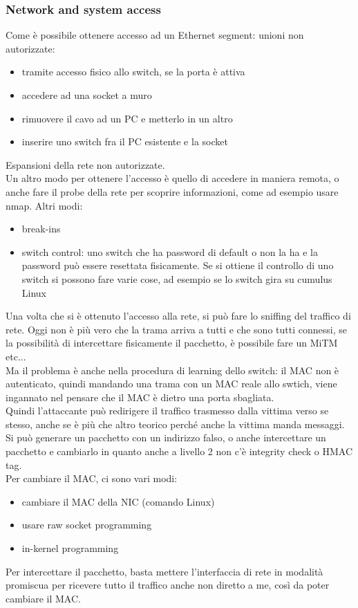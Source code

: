 \documentclass[12pt, oneside]{extbook} %
\begin{document}
\subsubsection{Network and system access}
Come è possibile ottenere accesso ad un Ethernet segment: unioni non autorizzate:
\begin{itemize}
\item tramite accesso fisico allo switch, se la porta è attiva
\item accedere ad una socket a muro
\item rimuovere il cavo ad un PC e metterlo in un altro
\item inserire uno switch fra il PC esistente e la socket
\end{itemize}
Espansioni della rete non autorizzate.\\ Un altro modo per ottenere l'accesso è quello di accedere in maniera remota, o anche fare il probe della rete per scoprire informazioni, come ad esempio usare nmap. Altri modi:
\begin{itemize}
\item break-ins
\item switch control: uno switch che ha password di default o non la ha e la password può essere resettata fisicamente. Se si ottiene il controllo di uno switch si possono fare varie cose, ad esempio se lo switch gira su cumulus Linux
\end{itemize}
Una volta che si è ottenuto l'accesso alla rete, si può fare lo sniffing del traffico di rete. Oggi non è più vero che la trama arriva a tutti e che sono tutti connessi, se la possibilità di intercettare fisicamente il pacchetto, è possibile fare un MiTM etc...\\ Ma il problema è anche nella procedura di learning dello switch: il MAC non è autenticato, quindi mandando una trama con un MAC reale allo swtich, viene ingannato nel pensare che il MAC è dietro una porta sbagliata.\\ Quindi l'attaccante può redirigere il traffico trasmesso dalla vittima verso se stesso, anche se è più che altro teorico perché anche la vittima manda messaggi.\\ Si può generare un pacchetto con un indirizzo falso, o anche intercettare un pacchetto e cambiarlo in quanto anche a livello 2 non c'è integrity check o HMAC tag.\\ Per cambiare il MAC, ci sono vari modi:
\begin{itemize}
\item cambiare il MAC della NIC (comando Linux)
\item usare raw socket programming
\item in-kernel programming
\end{itemize}
Per intercettare il pacchetto, basta mettere l'interfaccia di rete in modalità promiscua per ricevere tutto il traffico anche non diretto a me, così da poter cambiare il MAC.
\end{document}
